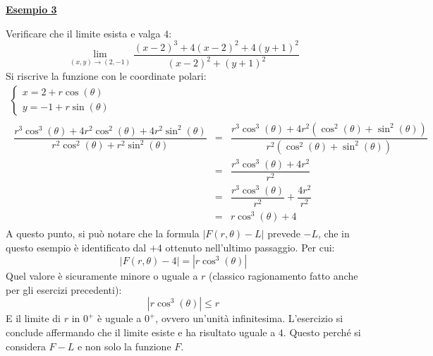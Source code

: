 \documentclass[a4paper]{article}
\newcommand{\example}[1]{\textcolor{Green4}{\textbf{#1}}}
\begin{document}
	\begin{flushleft}
		\example{\underline{Esempio 3}}
	\end{flushleft}
	Verificare che il limite esista e valga $4$:
	\begin{equation*}
		\displaystyle\lim_{\left(x,y\right) \rightarrow \left(2,-1\right)} \dfrac{\left(x-2\right)^{3} + 4\left(x-2\right)^{2} + 4\left(y+1\right)^{2}}{\left(x-2\right)^{2} + \left(y+1\right)^{2}}
	\end{equation*}
	Si riscrive la funzione con le coordinate polari:
	\begin{gather*}
		\begin{cases}
			x = 2 + r\cos\left(\theta\right) \\
			y = -1 + r\sin\left(\theta\right)
		\end{cases} \\
		\begin{array}{rcl}
			\dfrac{r^{3}\cos^{3}\left(\theta\right) + 4 r^{2} \cos^{2}\left(\theta\right) + 4 r^{2} \sin^{2}\left(\theta\right)}{r^{2} \cos^{2}\left(\theta\right) + r^{2} \sin^{2}\left(\theta\right)} 
			&=&
			\dfrac{
				r^{3}\cos^{3}\left(\theta\right) + 4r^{2}\left(\cos^{2}\left(\theta\right) + \sin^{2}\left(\theta\right)\right)
			}{
				r^{2}\left(\cos^{2}\left(\theta\right) + \sin^{2}\left(\theta\right)\right)
			} \\ [1.5em]
			&=&
			\dfrac{r^{3}\cos^{3}\left(\theta\right) + 4r^{2}}{r^{2}} \\ [1.5em]
			&=& \dfrac{r^{3}\cos^{3}\left(\theta\right)}{r^{2}} + \dfrac{4r^{2}}{r^{2}} \\ [1.5em]
			&=& r \cos^{3}\left(\theta\right) + 4
		\end{array}
	\end{gather*}
	A questo punto, si può notare che la formula $\left| F\left(r,\theta\right) - L \right|$ prevede $- L$, che in questo esempio è identificato dal $+4$ ottenuto nell'ultimo passaggio. Per cui:
	\begin{equation*}
		\left| F\left(r,\theta\right) - 4 \right| = \left| r \cos^{3}\left(\theta\right) \right|
	\end{equation*}
	Quel valore è sicuramente minore o uguale a $r$ (classico ragionamento fatto anche per gli esercizi precedenti):
	\begin{equation*}
		\left| r \cos^{3}\left(\theta\right) \right| \le r
	\end{equation*}
	E il limite di $r$ in $0^{+}$ è uguale a $0^{+}$, ovvero un'unità infinitesima. L'esercizio si conclude affermando che il limite esiste e ha risultato uguale a $4$. Questo perché si considera $F-L$ e non solo la funzione $F$.
\end{document}
